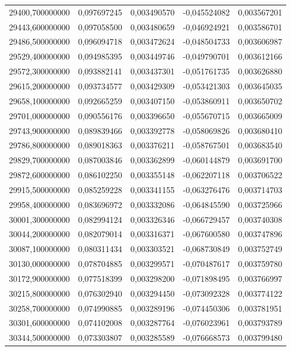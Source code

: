 \begin{longtable}{rrrrr}
29400,700000000 & 0,097697245 & 0,003490570 & -0,045524082 & 0,003567201\\
29443,600000000 & 0,097058500 & 0,003480659 & -0,046924921 & 0,003586701\\
29486,500000000 & 0,096094718 & 0,003472624 & -0,048504733 & 0,003606987\\
29529,400000000 & 0,094985395 & 0,003449746 & -0,049790701 & 0,003612166\\
29572,300000000 & 0,093882141 & 0,003437301 & -0,051761735 & 0,003626880\\
29615,200000000 & 0,093734577 & 0,003429309 & -0,053421303 & 0,003645035\\
29658,100000000 & 0,092665259 & 0,003407150 & -0,053860911 & 0,003650702\\
29701,000000000 & 0,090556176 & 0,003396650 & -0,055670715 & 0,003665009\\
29743,900000000 & 0,089839466 & 0,003392778 & -0,058069826 & 0,003680410\\
29786,800000000 & 0,089018363 & 0,003376211 & -0,058767501 & 0,003683540\\
29829,700000000 & 0,087003846 & 0,003362899 & -0,060144879 & 0,003691700\\
29872,600000000 & 0,086102250 & 0,003355148 & -0,062207118 & 0,003706522\\
29915,500000000 & 0,085259228 & 0,003341155 & -0,063276476 & 0,003714703\\
29958,400000000 & 0,083696972 & 0,003332086 & -0,064845590 & 0,003725966\\
30001,300000000 & 0,082994124 & 0,003326346 & -0,066729457 & 0,003740308\\
30044,200000000 & 0,082079014 & 0,003316371 & -0,067600580 & 0,003747896\\
30087,100000000 & 0,080311434 & 0,003303521 & -0,068730849 & 0,003752749\\
30130,000000000 & 0,078704885 & 0,003299571 & -0,070487617 & 0,003759780\\
30172,900000000 & 0,077518399 & 0,003298200 & -0,071898495 & 0,003766997\\
30215,800000000 & 0,076302940 & 0,003294450 & -0,073092328 & 0,003774122\\
30258,700000000 & 0,074990885 & 0,003289196 & -0,074450306 & 0,003781951\\
30301,600000000 & 0,074102008 & 0,003287764 & -0,076023961 & 0,003793789\\
30344,500000000 & 0,073303807 & 0,003285589 & -0,076668573 & 0,003799480\\

\end{longtable}
